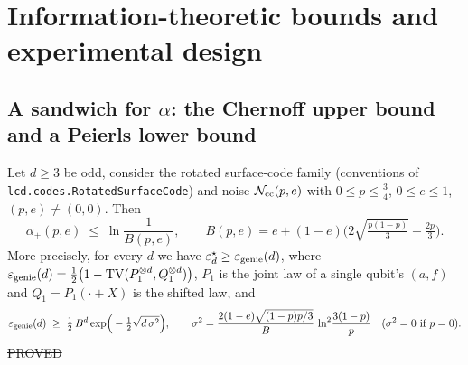 \section{Information-theoretic bounds and experimental design}\label{sec:info}

\subsection{A sandwich for $\alpha$: the Chernoff upper bound and a Peierls lower bound}

\begin{proposition}\label{prop:genie}
Let $d\ge3$ be odd, consider the rotated surface-code family (conventions of \texttt{lcd.codes.RotatedSurfaceCode}) and noise $\mathcal{N}_{\rm cc}(p,e)$ with $0\le p\le\tfrac34$, $0\le e\le1$, $(p,e)\ne(0,0)$. Then
\[
\alpha_+(p,e)\;\le\;\ln\frac1{B(p,e)},\qquad B(p,e)=e+(1-e)\Big(2\sqrt{\tfrac{p(1-p)}3}+\tfrac{2p}3\Big).
\]
More precisely, for every $d$ we have $\varepsilon^{\star}_d\ge\varepsilon_{\rm genie}(d)$, where
$\varepsilon_{\rm genie}(d)=\tfrac12\bigl(1-\mathrm{TV}(P_1^{\otimes d},Q_1^{\otimes d})\bigr)$,
$P_1$ is the joint law of a single qubit's $(a,f)$ and $Q_1=P_1(\cdot+X)$ is the shifted law, and
\[
\varepsilon_{\rm genie}(d)\;\ge\;\tfrac12\,B^d\exp\!\Big(-\tfrac12\sqrt{d\,\sigma^2}\Big),\qquad
\sigma^2=\frac{2(1-e)\sqrt{(1-p)p/3}}{B}\,\ln^2\!\frac{3(1-p)}{p}\quad(\sigma^2=0\text{ if }p=0).
\]
\hfill\st{PROVED}
\end{proposition}
